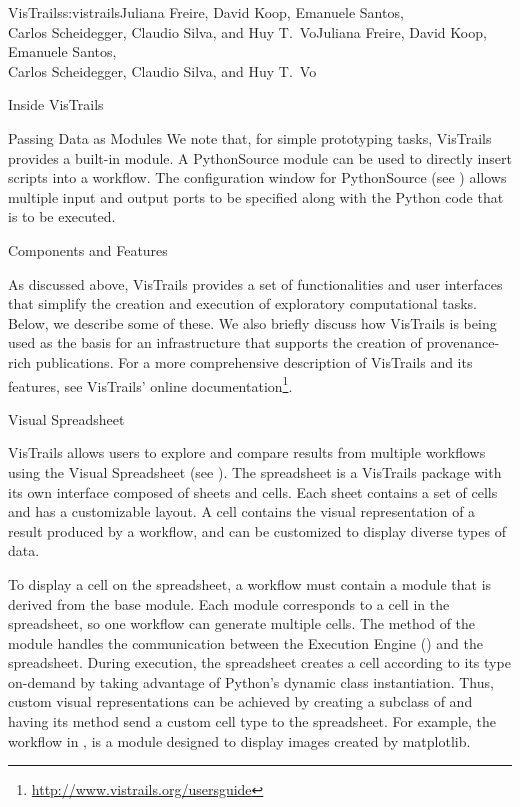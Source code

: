 \begin{aosachaptertoc}{VisTrails}{s:vistrails}{Juliana Freire, David Koop, Emanuele Santos, \\ Carlos Scheidegger, Claudio Silva, and Huy T.\ Vo}{Juliana Freire, David Koop, Emanuele Santos, \\ \hspace*{0.9cm} Carlos Scheidegger, Claudio Silva, and Huy T.\ Vo}
\begin{aosasect1}{Inside VisTrails}
\begin{aosasect2}{Passing Data as Modules}
We note that, for simple prototyping tasks, VisTrails provides a
built-in  module.  A PythonSource module can be
used to directly insert scripts into a workflow. The configuration
window for PythonSource (see )
allows multiple input and output ports to be specified along with the
Python code that is to be executed.

\end{aosasect2}

\end{aosasect1}

\begin{aosasect1}{Components and Features}

As discussed above, VisTrails provides a set of functionalities and
user interfaces that simplify the creation and execution of
exploratory computational tasks. Below, we describe some of these. We
also briefly discuss how VisTrails is being used as the basis for an
infrastructure that supports the creation of provenance-rich
publications. For a more comprehensive description of VisTrails and its features,
see VisTrails' online documentation\footnote{\url{http://www.vistrails.org/usersguide}}.


\begin{aosasect2}{Visual Spreadsheet}

VisTrails allows users to explore and compare results from multiple
workflows using the Visual Spreadsheet (see
). The spreadsheet is a
VisTrails package with its own interface composed of sheets and
cells. Each sheet contains a set of cells and has a customizable
layout.  A cell contains the visual representation of a result
produced by a workflow, and can be customized to display diverse types
of data.

To display a cell on the spreadsheet, a workflow must contain a module
that is derived from the base  module.  Each
 module corresponds to a cell in the
spreadsheet, so one workflow can generate multiple cells.  The
 method of the  module handles the
communication between the Execution Engine
() and the spreadsheet.  During
execution, the spreadsheet creates a cell according to its type
on-demand by taking advantage of Python's dynamic class instantiation.
Thus, custom visual representations can be achieved by creating a
subclass of  and having its 
method send a custom cell type to the spreadsheet. For example, the
workflow in , 
is a  module designed to display images created
by matplotlib.


\end{aosasect2}
\end{aosasect1}
\end{aosachaptertoc}
